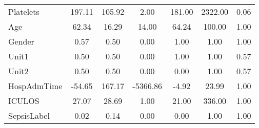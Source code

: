 \begin{longtable}{lcccccc}
Platelets        & 197.11 &             105.92 &     2.00 & 181.00 & 2322.00 &            0.06 \\
Age              &  62.34 &              16.29 &    14.00 &  64.24 &  100.00 &            1.00 \\
Gender           &   0.57 &               0.50 &     0.00 &   1.00 &    1.00 &            1.00 \\
Unit1            &   0.50 &               0.50 &     0.00 &   1.00 &    1.00 &            0.57 \\
Unit2            &   0.50 &               0.50 &     0.00 &   0.00 &    1.00 &            0.57 \\
HospAdmTime      & -54.65 &             167.17 & -5366.86 &  -4.92 &   23.99 &            1.00 \\
ICULOS           &  27.07 &              28.69 &     1.00 &  21.00 &  336.00 &            1.00 \\
SepsisLabel      &   0.02 &               0.14 &     0.00 &   0.00 &    1.00 &            1.00 \\
\end{longtable}
